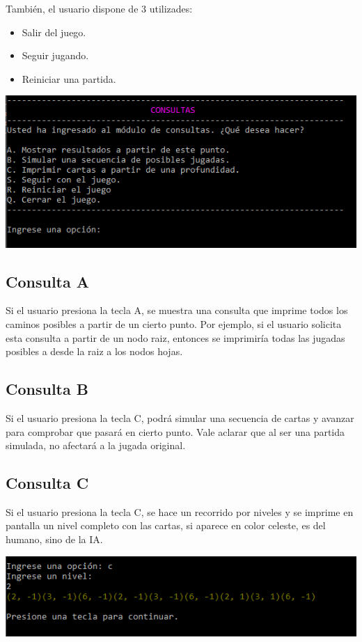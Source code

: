 \documentclass[12pt,a4paper]{article}
\begin{document}
También, el usuario dispone de 3 utilizades:
\begin{itemize}
\item Salir del juego.
\item Seguir jugando.
\item Reiniciar una partida.
\end{itemize}
\begin{center}
\includegraphics[scale=0.7]{captura3.PNG} 
\end{center}
\subsection{Consulta A}
Si el usuario presiona la tecla A, se muestra una consulta que imprime todos los caminos posibles a partir de un cierto punto. Por ejemplo, si el usuario solicita esta consulta a partir de un nodo raiz, entonces se imprimiría todas las jugadas posibles a desde la raiz a los nodos hojas. 
\subsection{Consulta B}
Si el usuario presiona la tecla C, podrá simular una secuencia de cartas y avanzar para comprobar que pasará en cierto punto.
Vale aclarar que al ser una partida simulada, no afectará a la jugada original.
\subsection{Consulta C}
Si el usuario presiona la tecla C, se hace un recorrido por niveles y se imprime en pantalla un nivel completo con las cartas, si aparece en color celeste, es del humano, sino de la IA.
\begin{center}
\includegraphics[scale=0.8]{captura4.PNG} 
\end{center}
\newpage
\end{document}

